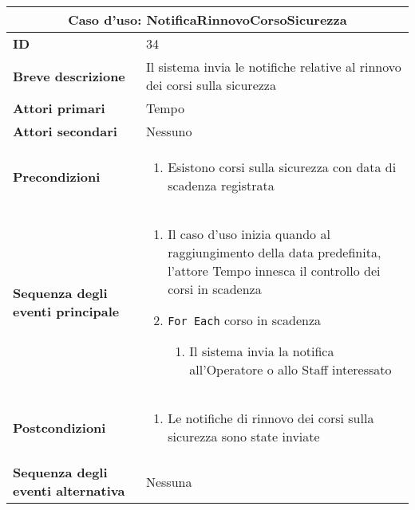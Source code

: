 \documentclass[a4paper]{report}
\begin{document}
\clearpage
\begin{table}[H]
\vspace*{-0cm}
\renewcommand{\arraystretch}{1.9}
\begin{tabular}{|p{3.9cm}|p{9.9cm}|}
\hline
\multicolumn{2}{|c|}{\textbf{Caso d’uso: NotificaRinnovoCorsoSicurezza}} \\ \hline
	\textbf{ID} & 34 \\ \hline
	\textbf{Breve descrizione} & Il sistema invia le notifiche relative al rinnovo dei corsi sulla sicurezza \\ \hline
	\textbf{Attori primari} & Tempo \\ \hline
	\textbf{Attori secondari} & Nessuno \\ \hline
	\textbf{Precondizioni} & \begin{enumerate}[leftmargin=14pt,label=\arabic*.,labelsep=0.5em,topsep=0pt,partopsep=0pt,parsep=0pt,itemsep=0pt]
        \item Esistono corsi sulla sicurezza con data di scadenza registrata
    \end{enumerate} \\ \hline
	\textbf{Sequenza degli eventi principale} & 
\begin{enumerate}[leftmargin=14pt,label=\arabic*.,labelsep=0.5em,topsep=0pt,partopsep=0pt,parsep=0pt,itemsep=0pt]
    \item Il caso d’uso inizia quando al raggiungimento della data predefinita, l’attore Tempo innesca il controllo dei corsi in scadenza
    \item \texttt{For Each} corso in scadenza
    \begin{enumerate}[label=\arabic{enumi}.\arabic*.,leftmargin=22pt,labelsep=0.5em,topsep=0pt,partopsep=0pt,parsep=0pt,itemsep=0pt]
        \item Il sistema invia la notifica all’Operatore o allo Staff interessato
    \end{enumerate}
\end{enumerate}\\ \hline
	\textbf{Postcondizioni} &
    \begin{enumerate}[label=\arabic*.,leftmargin=14pt,labelsep=0.5em,topsep=0pt,partopsep=0pt,parsep=0pt,itemsep=0pt]
        \item Le notifiche di rinnovo dei corsi sulla sicurezza sono state inviate
    \end{enumerate} \\ \hline
	\textbf{Sequenza degli eventi alternativa} & Nessuna \\ \hline
\end{tabular}
\end{table}
\end{document}
